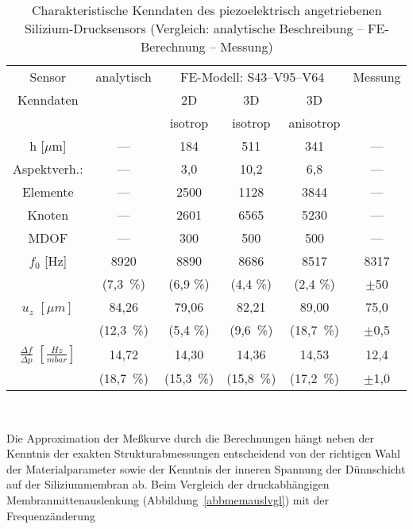 \begin{table}[htb]
\caption
 {\label{tabvglm723}
 Charakteristische Kenndaten des piezoelektrisch angetriebenen
 Silizium-Drucksensors
 (Vergleich: analytische Beschreibung -- FE-Berechnung -- Messung)}
\begin{center}
\begin{tabular}{|c||c||c|c|c||c|}
\hline
Sensor & analytisch & \multicolumn{3}{c||}{FE-Modell: S43--V95--V64}
       & Messung \\
\cline{3-5}
 Kenndaten &     & 2D      & 3D      & 3D        & \\[-1.2ex]
           &     & isotrop & isotrop & anisotrop & \\
\hline \hline
h $[\mu$m] & --- & 184     & 511     & 341       & --- \\
Aspektverh.: & --- & 3,0 & 10,2 & 6,8 & --- \\
\hline
Elemente   & --- & 2500    & 1128    & 3844      & --- \\
Knoten     & --- & 2601    & 6565    & 5230      & --- \\
MDOF       & --- & 300     & 500     & 500       & --- \\
\hline \hline
$f_{0}$ [Hz]
           &  8920  &  8890   &  8686   &  8517   &  8317   \\
           & (7,3~\%) & (6,9 \%) & (4,4 \%) & (2,4 \%) &  $\pm$50 \\
\hline
$u_{z}$ $[\mu m]$
           & 84,26    &  79,06   & 82,21   & 89,00    & 75,0     \\
           & (12,3~\%) & (5,4 \%) & (9,6~\%) & (18,7~\%) & $\pm$0,5  \\
\hline
$\frac{\Delta f}{\Delta p}$ $[\frac{Hz}{mbar}]$
        & 14,72    & 14,30    & 14,36    & 14,53    & 12,4    \\
  	& (18,7~\%) & (15,3~\%) & (15,8~\%) & (17,2~\%) & $\pm$1,0 \\
\hline
\end{tabular}\\
\end{center}
\end{table}
Die Approximation der Meßkurve durch die Berechnungen hängt neben
der Kenntnis der exakten Strukturabmessungen entscheidend von der richtigen
Wahl der Materialparameter sowie der Kenntnis der inneren Spannung der
Dünnschicht auf der Siliziummembran ab.
Beim Vergleich der druckabhängigen Membranmittenauslenkung
(Abbildung~\ref{abbmemauslvgl}) mit der Frequenzänderung
